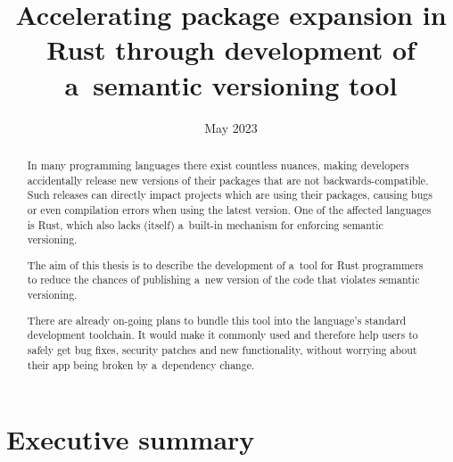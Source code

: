 \documentclass[licencjacka,en]{pracamgr}
\date{May 2023}
\title{Accelerating package expansion in Rust through development of a~semantic versioning tool}
\begin{document}
\maketitle

\begin{abstract}
In many programming languages there exist countless nuances, making developers accidentally release
new versions of their packages that are not backwards-compatible. Such releases can directly impact
projects which are using their packages, causing bugs or even compilation errors when using the
latest version. One of the affected languages is Rust, which also lacks (itself) a~built-in
mechanism for enforcing semantic versioning.

The aim of this thesis is to describe the development of a~tool for Rust programmers to reduce the
chances of publishing a~new version of the code that violates semantic versioning.

There are already on-going plans to bundle this tool into the language's standard
development toolchain. It would make it commonly used and therefore help users to safely get
bug fixes, security patches and new functionality, without worrying about their app being broken
by a~dependency change.
\end{abstract}




\tableofcontents

\chapter*{Executive summary}
\end{document}
